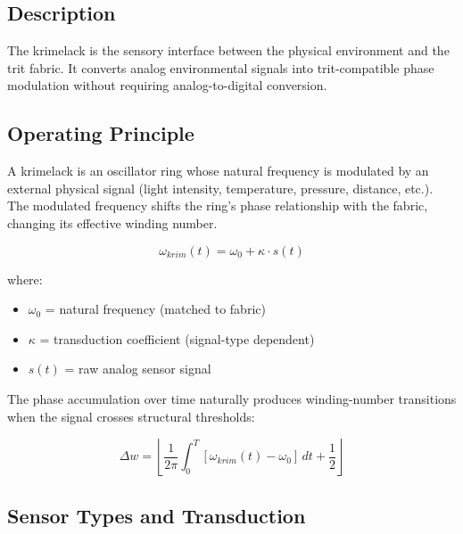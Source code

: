 \documentclass[11pt, a4paper]{article}
\begin{document}
\subsection{Description}

The krimelack is the sensory interface between the physical environment
and the trit fabric. It converts analog environmental signals into
trit-compatible phase modulation without requiring analog-to-digital
conversion.

\subsection{Operating Principle}

A krimelack is an oscillator ring whose natural frequency is modulated
by an external physical signal (light intensity, temperature, pressure,
distance, etc.). The modulated frequency shifts the ring's phase
relationship with the fabric, changing its effective winding number.

\begin{equation}
  \omega_{krim}(t) = \omega_0 + \kappa \cdot s(t)
\end{equation}

where:
\begin{itemize}[nosep]
  \item $\omega_0$ = natural frequency (matched to fabric)
  \item $\kappa$ = transduction coefficient (signal-type dependent)
  \item $s(t)$ = raw analog sensor signal
\end{itemize}

The phase accumulation over time naturally produces winding-number
transitions when the signal crosses structural thresholds:

\begin{equation}
  \Delta w = \left\lfloor \frac{1}{2\pi} \int_0^T [\omega_{krim}(t) - \omega_0]\, dt + \frac{1}{2} \right\rfloor
\end{equation}

\subsection{Sensor Types and Transduction}
\end{document}
